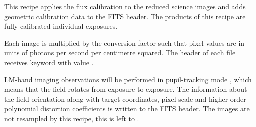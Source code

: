 This recipe applies the flux calibration to the reduced science
images and adds geometric calibration data to the FITS header. The
products of this recipe are fully calibrated individual exposures.

Each image is multiplied by the conversion factor such that pixel
values are in units of photons per second per centimetre squared. The
header of each file receives keyword  with value %
.


LM-band imaging observations will be performed in pupil-tracking mode
\cite{METIS-operational_concept}, which means that the field rotates
from exposure to exposure.  The information about the field
orientation along with target coordinates, pixel scale and
higher-order polynomial distortion coefficients is written to the FITS
header. The images are not resampled by this recipe, this is left to
.



